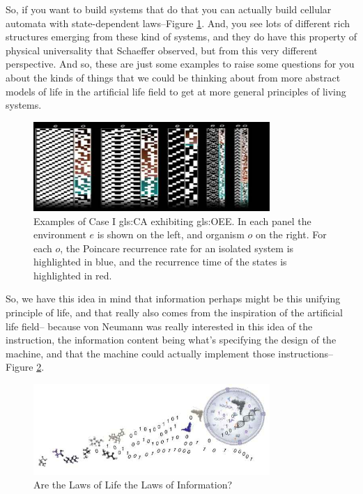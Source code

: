 \documentclass[]{article}
\begin{document}
So, if you want to build systems that do that you can actually build cellular automata with state-dependent laws--Figure \ref{fig:CA-Example}.
And, you see lots of different rich structures emerging from these kind of systems, and they do have this property of physical universality that Schaeffer observed, but from this very different perspective.
And so, these are just some examples to raise some questions for you about the kinds of things that we could be thinking about from more abstract models of life in the artificial life field to get at more general principles of living systems.


\begin{figure}[H]
	\caption[You can  build cellular automata
		with state-dependent laws]{Examples of Case I \gls{gls:CA} exhibiting \gls{gls:OEE}. In each panel the environment $e$ is shown on the left, and organism $o$ on the right. For each $o$, the Poincare recurrence rate for an isolated system is highlighted in blue, and the recurrence time of the states is highlighted in red.\cite{adams2017situation}}\label{fig:CA-Example}
	\includegraphics[width=0.8\textwidth]{CA-Example}
\end{figure}

So, we have this idea in mind
that information perhaps
might be this unifying principle of life,
and that really also comes from
the inspiration of
the artificial life field--
because von Neumann was really interested
in this idea of the instruction,
the information content being what's
specifying the design of the machine,
and that the machine could actually
implement those instructions--Figure \ref{fig:LawsLifeLawsInformation}.

\begin{figure}[H]
	\caption{Are the Laws of Life the Laws of Information?}\label{fig:LawsLifeLawsInformation}
	\includegraphics[width=0.8\textwidth]{LawsLifeLawsInformation}
\end{figure}
\end{document}
